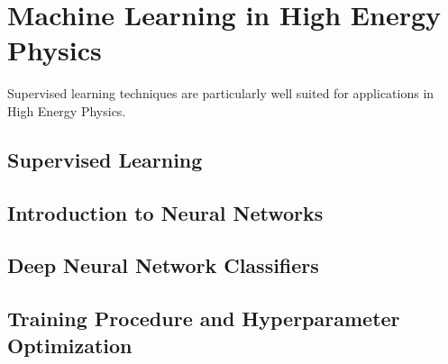 \chapter{Machine Learning in High Energy Physics}
\label{chap:ml}

Supervised learning techniques are particularly well suited for applications in High Energy Physics.
\section{Supervised Learning}

\section{Introduction to Neural Networks}

\section{Deep Neural Network Classifiers}

\section{Training Procedure and Hyperparameter Optimization}


